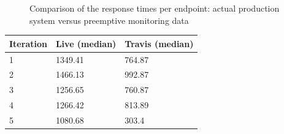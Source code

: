 \documentclass[conference]{IEEEtran}
\begin{document}
  


\begin{figure}[h!]
  \centering
  \quad
  \caption{Comparison of the response times per endpoint: actual production system versus preemptive monitoring data}
  \label{fig:preemptive}
\end{figure}


\begin{table}[h]
  \begin{tabular}{lll}
    \toprule
    Iteration & \bfseries Live (median) & \bfseries Travis (median)\\
    \midrule
    1 & 1349.41 & 764.87\\ 
    2 & 1466.13 & 992.87\\
    3 & 1256.65 & 760.87\\
    4 & 1266.42 & 813.89\\
    5 & 1080.68 & 303.4\\
    \bottomrule
  \end{tabular}
\end{table}
\end{document}
